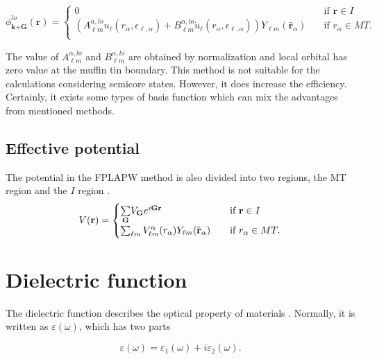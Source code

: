 \documentclass[a4paper, 12pt, titlepage,oneside,drop]{kthesis}
\begin{document}
\begin{equation}\label{lap6}
\phi^{lo}_\textbf{k+G} (\textbf{r}) = 
\begin{cases} 0 & \quad \mbox{if $\textbf{r} \in {I} $}
\\
(A _{{\ell}m}^{\alpha,lo}  u_{{\ell}}(r_{\alpha}, \epsilon_{\ell,\alpha}) + B _{{\ell}m}^{\alpha,lo}  \dot{u}_{{\ell}}(r_{\alpha}, \epsilon_{\ell,\alpha}) ){Y_{{\ell}m}(\hat{\textbf{r}}_{\alpha})} & \quad \mbox{if $r_{\alpha} \in MT. $}\\ 
\end{cases}
\end{equation}
 
The value of $A _{{\ell}m}^{\alpha,lo}$ and $B _{{\ell}m}^{\alpha,lo}$ are obtained by normalization and local orbital has zero value at the muffin tin boundary. This method is not suitable for the calculations considering semicore states.
However, it does increase the efficiency. Certainly, it exists some types of basis function which can mix the advantages from mentioned methods.

\subsection{Effective potential}

\label{epote}
The potential in the FPLAPW method is also divided into two regions, the MT region and the $I$ region \cite{nordstrom2006planewaves}.
\begin{equation*}\label{lap7}
V(\textbf{r}) = 
\begin{cases} \sumg<{\textbf G}> V_{\textbf G} e^{i {\textbf G} {\textbf {r}  }} & \quad \mbox{if $\textbf{r} \in {I} $}
\\
 \sum_{{\ell}m} V_{{\ell}m}^{\alpha} (r_{\alpha}) Y_{{\ell}m}(\hat{{\textbf r}}_{\alpha})  & \quad \mbox{if $r_{\alpha} \in MT. $}\\ 
\end{cases}
\end{equation*}

\section{Dielectric function}
The dielectric function describes the optical property of materials \cite{penn1962wave, fox2002optical}. Normally, it is written as $\varepsilon(\omega)$, which has two parts

\begin{equation}
 \varepsilon(\omega) = \varepsilon_1(\omega) + i \varepsilon_2(\omega).
\end{equation}
\end{document}
